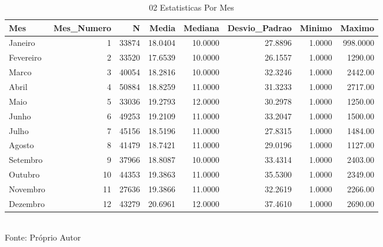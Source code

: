 \begin{table}[H]
\centering
\small
\caption{02 Estatisticas Por Mes}
\label{tab:03_02_Estatisticas_Descritivas}
\begin{tabular}{|l|r|r|r|r|r|r|r|}
\hline
\textbf{Mes} & \textbf{Mes\_Numero} & \textbf{N} & \textbf{Media} & \textbf{Mediana} & \textbf{Desvio\_Padrao} & \textbf{Minimo} & \textbf{Maximo} \\
\hline
Janeiro & 1 & 33874 & 18.0404 & 10.0000 & 27.8896 & 1.0000 & 998.0000 \\
Fevereiro & 2 & 33520 & 17.6539 & 10.0000 & 26.1557 & 1.0000 & 1290.00 \\
Marco & 3 & 40054 & 18.2816 & 10.0000 & 32.3246 & 1.0000 & 2442.00 \\
Abril & 4 & 50884 & 18.8259 & 11.0000 & 31.3233 & 1.0000 & 2717.00 \\
Maio & 5 & 33036 & 19.2793 & 12.0000 & 30.2978 & 1.0000 & 1250.00 \\
Junho & 6 & 49253 & 19.2109 & 11.0000 & 33.2047 & 1.0000 & 1500.00 \\
Julho & 7 & 45156 & 18.5196 & 11.0000 & 27.8315 & 1.0000 & 1484.00 \\
Agosto & 8 & 41479 & 18.7421 & 11.0000 & 29.0196 & 1.0000 & 1127.00 \\
Setembro & 9 & 37966 & 18.8087 & 10.0000 & 33.4314 & 1.0000 & 2403.00 \\
Outubro & 10 & 44353 & 19.3863 & 11.0000 & 35.5300 & 1.0000 & 2349.00 \\
Novembro & 11 & 27636 & 19.3866 & 11.0000 & 32.2619 & 1.0000 & 2266.00 \\
Dezembro & 12 & 43279 & 20.6961 & 12.0000 & 37.4610 & 1.0000 & 2690.00 \\
\hline
\end{tabular}
\\ \small Fonte: Próprio Autor
\end{table}
